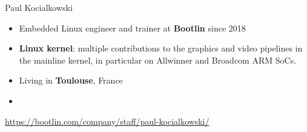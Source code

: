 \begin{frame}{Paul Kocialkowski}
    \begin{itemize}
	\item Embedded Linux engineer and trainer at {\bf Bootlin}
              since 2018
	\item {\bf Linux kernel}: multiple contributions to the graphics
	      and video pipelines in the mainline kernel, in particular
	      on Allwinner and Broadcom ARM SoCs.
	\item Living in {\bf Toulouse}, France
	\item {}
    \end{itemize}
    {\small \url{https://bootlin.com/company/staff/paul-kocialkowski/}}
\end{frame}
